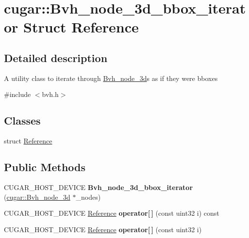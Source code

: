 \hypertarget{structcugar_1_1_bvh__node__3d__bbox__iterator}{}\section{cugar\+:\+:Bvh\+\_\+node\+\_\+3d\+\_\+bbox\+\_\+iterator Struct Reference}
\label{structcugar_1_1_bvh__node__3d__bbox__iterator}


\subsection{Detailed description}
A utility class to iterate through \hyperlink{structcugar_1_1_bvh__node__3d}{Bvh\+\_\+node\+\_\+3d}\textquotesingle{}s as if they were bboxes 

{\ttfamily \#include $<$bvh.\+h$>$}

\subsection*{Classes}
\begin{DoxyCompactItemize}
\item 
struct \hyperlink{structcugar_1_1_bvh__node__3d__bbox__iterator_1_1_reference}{Reference}
\end{DoxyCompactItemize}
\subsection*{Public Methods}
\begin{DoxyCompactItemize}
\item 
\mbox{\label{structcugar_1_1_bvh__node__3d__bbox__iterator_a48553587be15e9be3a3c5474bd7cdc5d}} 
C\+U\+G\+A\+R\+\_\+\+H\+O\+S\+T\+\_\+\+D\+E\+V\+I\+CE {\bfseries Bvh\+\_\+node\+\_\+3d\+\_\+bbox\+\_\+iterator} (\hyperlink{structcugar_1_1_bvh__node__3d}{cugar\+::\+Bvh\+\_\+node\+\_\+3d} $\ast$\+\_\+nodes)
\item 
\mbox{\label{structcugar_1_1_bvh__node__3d__bbox__iterator_ae7922015097f39e58d94ef1e4cdea1eb}} 
C\+U\+G\+A\+R\+\_\+\+H\+O\+S\+T\+\_\+\+D\+E\+V\+I\+CE \hyperlink{structcugar_1_1_bvh__node__3d__bbox__iterator_1_1_reference}{Reference} {\bfseries operator\mbox{[}$\,$\mbox{]}} (const uint32 i) const
\item 
\mbox{\label{structcugar_1_1_bvh__node__3d__bbox__iterator_a55309a467a87be865c1dfd5b6bfea748}} 
C\+U\+G\+A\+R\+\_\+\+H\+O\+S\+T\+\_\+\+D\+E\+V\+I\+CE \hyperlink{structcugar_1_1_bvh__node__3d__bbox__iterator_1_1_reference}{Reference} {\bfseries operator\mbox{[}$\,$\mbox{]}} (const uint32 i)
\end{DoxyCompactItemize}
